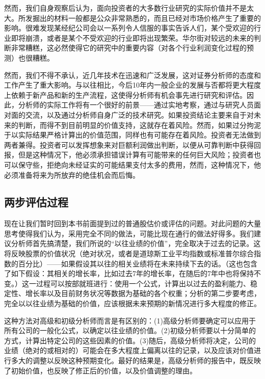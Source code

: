 \documentclass[12pt,oneside]{book}
\begin{document}
然而，我们自身观察后认为，面向投资者的大多数行业研究的实际价值并不是太大。所发掘出的材料一般都是公众非常熟悉的，而且已经对市场价格产生了重要的影响。很难发现某经纪公司会以一系列令人信服的事实告诉人们，某个受欢迎的行业即将崩溃，或者是某个不受欢迎的行业即将出现繁荣。华尔街对较远的未来的判断非常糟糕，这必然使得它的研究中的重要内容（对各个行业利润变化过程的预测）也很糟糕。

然而，我们不得不承认，近几年技术在迅速和广泛发展，这对证券分析师的态度和工作产生了重大影响。与以往相比，今后10年内一般企业的发展与否都将更大程度上依赖于新产品和新的生产流程，这使得分析师有机会事先进行研究和评估。因此，分析师的实际工作将有一个很好的前景——通过实地考察，通过与研究人员面对面的交流，以及通过分析师自身广泛的技术研究。如果投资结论主要来自于对未来的判断，而得不到目前明显的价值支持，这就存在着风险。然而，如果过分拘泥于以实际结果严格计算出的价值范围，同样也有可能存在着风险。投资者无法做到两者兼得。投资者可以发挥想象来对巨额利润做出判断，以便从可靠判断中获得回报，但是这种情况下，他必须承担错误计算有可能带来的任何巨大风险；投资者也可以保守些，拒绝向未经证实的可能结果支付太多的费用，然而，这种情况下，他必须准备将来为所放弃的绝佳机会而后悔。

\subsection{两步评估过程}
现在让我们暂时回到本书前面提到过的普通股估价或评估的问题。对此问题的大量思考使得我们认为，采用完全不同的做法，可能比现在通行的做法好得多。我们建议分析师首先搞清楚，我们所说的“以往业绩的价值”，完全取决于过去的记录。这将反映股票的价值状况（绝对状况，或者是道琼斯工业平均指数或标准普尔综合指数的百分比）——如果假设其以往的相关业绩将在未来持续下去的话。（这也包含了如下假设：其相关的增长率，比如过去7年的增长率，在随后的7年中也将保持不变。）这一过程可以按部就班进行：使用一个公式，计算出以过去的盈利能力、稳定性、增长率以及目前财务状况等数据为基础的各个权重；分析的第二步要考虑，完全以以往业绩为基础的价值，应该根据未来预期的新情况进行多大程度的修正。

这种方法对高级和初级分析师而言是有区别的：(1)高级分析师要确定可以应用于所有公司的一般化公式，以确定以往业绩的价值。(2)初级分析师要以十分简单的方式，计算出特定公司的这些因素的价值。(3)随后，高级分析师将决定，公司的业绩（绝对的或相对的）可能会在多大程度上偏离以往的记录，以及应该对价值进行多大的调整以反映这种预期变化。最好的结果是，高级分析师的报告中，既反映了初始价值，也反映了修正后的价值，以及价值调整的理由。
\end{document}

